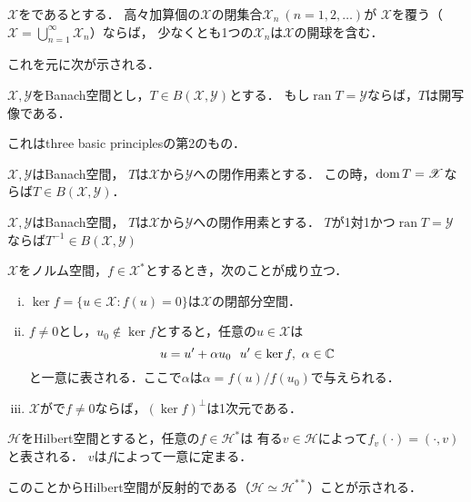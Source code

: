 \documentclass[a4j]{jsarticle}
\newcommand{\ran}{\operatorname{ran}}
\newcommand{\spX}{\mathscr{X}}
\newcommand{\spY}{\mathscr{Y}}
\newcommand{\spB}[2]{B(\mathscr{#1}, \mathscr{#2})}
\begin{document}
    \begin{Thm}[定理7.23, p.167, Baireのカテゴリー定理] \label{them7:23}
        $\spX$をであるとする．
        高々加算個の$\spX$の閉集合$\spX_n ~(n=1,2,\dots)$が
        $\spX$を覆う（$\spX=\bigcup_{n=1}^{\infty}{\spX_n}$）ならば，
        少なくとも1つの$\spX_n$は$\spX$の開球を含む．
    \end{Thm}
    これを元に次が示される．

    \begin{Thm}[定理7.30, p.170, 開写像原理] \label{them7:30}
        $\spX, \spY$をBanach空間とし，$T \in \spB{X}{Y}$とする．
        もし$\ran T=\spY$ならば，$T$は開写像である．
    \end{Thm}
    これはthree basic principlesの第2のもの．

    \begin{Thm}[定理7.33, p.172, 閉グラフ定理] \label{them7:33}
        $\spX, \spY$はBanach空間，
        $T$は$\spX$から$\spY$への閉作用素とする．
        この時，$\dom T=\spX$ならば$T \in \spB{X}{Y}$．
    \end{Thm}

    \begin{Cor}[系7.34, p.172] \label{cor7:34}
        $\spX, \spY$はBanach空間，
        $T$は$\spX$から$\spY$への閉作用素とする．
        $T$が1対1かつ$\ran T=\spY$ならば$T^{-1} \in \spB{X}{Y}$
    \end{Cor}


    \begin{Thm}[定理8.3, p.176] \label{them8:3}
        $\spX$をノルム空間，$f \in \spX^{\ast}$とするとき，次のことが成り立つ．
        \begin{enumerate}[i)]
            \setlength{\leftskip}{5truemm}
            \item $\ker f=\{ u \in \spX : f(u)=0 \}$は$\spX$の閉部分空間．
            \item $f\neq 0$とし，$u_0 \not \in \ker f$とすると，任意の$u \in \spX$は
                  \[ u=u'+\alpha u_0 ~~ u' \in \ker f,~ \alpha \in \mathbb{C} \]
                  と一意に表される．ここで$\alpha$は$\alpha = f(u)/f(u_0)$で与えられる．
              \item $\spX$がで$f \neq 0$ならば，$(\ker f)^{\perp}$は1次元である．
        \end{enumerate}
    \end{Thm}
    \begin{Thm}[定理8.5, p.177, Rieszの表現定理] \label{them8:5}
        $\mathscr{H}$をHilbert空間とすると，任意の$f \in \mathscr{H}^{\ast}$は
        有る$v \in \mathscr{H}$によって$f_v(\cdot)=(\cdot,v)$と表される．
        $v$は$f$によって一意に定まる．
    \end{Thm}
    このことからHilbert空間が反射的である（$\mathscr{H} \simeq \mathscr{H}^{\ast\ast}$）ことが示される．
\end{document}
